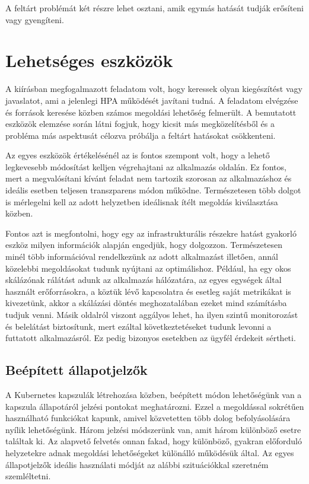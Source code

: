 A feltárt problémát két részre lehet osztani, amik egymás hatását tudják erősíteni vagy gyengíteni.

\section{Lehetséges eszközök}

A kiírásban megfogalmazott feladatom volt, hogy keressek olyan kiegészítést vagy javaslatot, ami a jelenlegi HPA működését javítani tudná.
A feladatom elvégzése és források keresése közben számos megoldási lehetőség felmerült.
A bemutatott eszközök elemzése során látni fogjuk, hogy kicsit más megközelítésből és a probléma más aspektusát célozva próbálja a feltárt hatásokat csökkenteni.

Az egyes eszközök értékelésénél az is fontos szempont volt, hogy a lehető legkevesebb módosítást kelljen végrehajtani az alkalmazás oldalán.
Ez fontos, mert a megvalósítani kívánt feladat nem tartozik szorosan az alkalmazáshoz és ideális esetben teljesen transzparens módon működne.
Természetesen több dolgot is mérlegelni kell az adott helyzetben ideálisnak ítélt megoldás kiválasztása közben.

Fontos azt is megfontolni, hogy egy az infrastrukturális részekre hatást gyakorló eszköz milyen információk alapján engedjük, hogy dolgozzon.
Természetesen minél több információval rendelkezünk az adott alkalmazást illetően, annál közelebbi megoldásokat tudunk nyújtani az optimálishoz.
Például, ha egy okos skálázónak rálátást adunk az alkalmazás hálózatára, az egyes egységek által használt erőforrásokra, a köztük lévő kapcsolatra és esetleg saját metrikákat is kivezetünk, akkor a skálázási döntés meghozatalában ezeket mind számításba tudjuk venni.
Másik oldalról viszont aggályos lehet, ha ilyen szintű monitorozást és belelátást biztosítunk, mert ezáltal következtetéseket tudunk levonni a futtatott alkalmazásról.
Ez pedig bizonyos esetekben az ügyfél érdekeit sértheti.


\subsection{Beépített állapotjelzők}
A Kubernetes kapszulák létrehozása közben, beépített módon lehetőségünk van a kapszula állapotáról jelzési pontokat meghatározni.
Ezzel a megoldással sokrétűen használható funkciókat kapunk, amivel közvetetten több dolog befolyásolására nyílik lehetőségünk.
Három jelzési módszerünk van, amit három különböző esetre találtak ki.
Az alapvető felvetés onnan fakad, hogy különböző, gyakran előforduló helyzetekre adnak megoldási lehetőségeket különálló működésük által.
Az egyes állapotjelzők ideális használati módját az alábbi szituációkkal szeretném szemléltetni.

